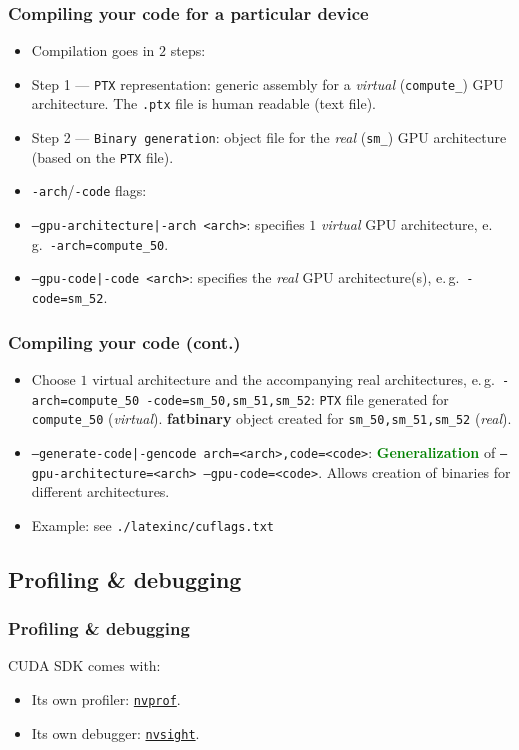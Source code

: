 \begin{frame}
  \frametitle{Compiling your code for a particular device}
  \begin{itemize}
    \item Compilation goes in $2$ steps:
    \item Step 1 --- \texttt{PTX} representation: generic assembly for a
          \textit{virtual} (\texttt{compute\_}) GPU architecture.
          The \texttt{.ptx} file is human readable (text file).
    \item Step 2 --- \texttt{Binary generation}: object file for the
          \textit{real} (\texttt{sm\_}) GPU architecture (based on the \texttt{PTX} file).
    \item \texttt{-arch}/\texttt{-code} flags:
    \item \texttt{--gpu-architecture|-arch <arch>}: specifies $1$ \textit{virtual}
          GPU architecture, e.\,g.\ \texttt{-arch=compute\_50}.
    \item \texttt{--gpu-code|-code <arch>}: specifies the \textit{real}
          GPU architecture(s), e.\,g.\ \texttt{-code=sm\_52}.
  \end{itemize}
\end{frame}

\begin{frame}
  \frametitle{Compiling your code (cont.)}
  \begin{itemize}
    \item Choose $1$ virtual architecture and the accompanying real architectures,
          e.\,g.\ \texttt{-arch=compute\_50 -code=sm\_50,sm\_51,sm\_52}:
          \texttt{PTX} file generated for \texttt{compute\_50} (\textit{virtual}).
          \textbf{fatbinary} object created for \texttt{sm\_50,sm\_51,sm\_52} (\textit{real}).
    \item \texttt{--generate-code|-gencode arch=<arch>,code=<code>}:
          \textbf{\textcolor{green}{Generalization}} of
          \texttt{--gpu-architecture=<arch> --gpu-code=<code>}.
          Allows creation of binaries for different architectures.
    \item Example: see \texttt{./latexinc/cuflags.txt}
  \end{itemize}
\end{frame}

\subsection{Profiling \& debugging}

\begin{frame}
  \frametitle{Profiling \& debugging}
  CUDA SDK comes with:
  \begin{itemize}
    \item Its own profiler:
          \href{https://docs.nvidia.com/cuda/profiler-users-guide/}{\texttt{nvprof}}.
    \item Its own debugger:
          \href{https://docs.nvidia.com/nsight-visual-studio-edition/cuda-debugger/}{\texttt{nvsight}}.
  \end{itemize}
\end{frame}

